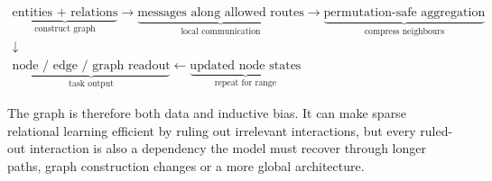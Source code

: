 \[
\boxed{
\begin{gathered}
\underbrace{\text{entities + relations}}_{\text{construct graph}}
\rightarrow
\underbrace{\text{messages along allowed routes}}_{\text{local communication}}
\rightarrow
\underbrace{\text{permutation-safe aggregation}}_{\text{compress neighbours}}
\\[1mm]
\downarrow
\\[-1mm]
\underbrace{\text{node / edge / graph readout}}_{\text{task output}}
\leftarrow
\underbrace{\text{updated node states}}_{\text{repeat for range}}
\end{gathered}
}
\]

The graph is therefore both data and inductive bias.
It can make sparse relational learning efficient by ruling out irrelevant interactions, but every ruled-out interaction is also a dependency the model must recover through longer paths, graph construction changes or a more global architecture.

